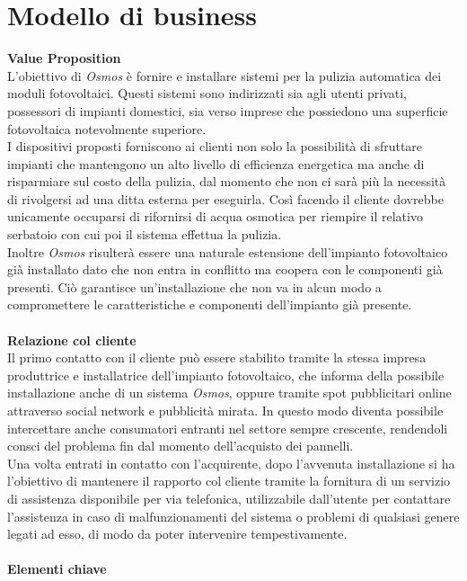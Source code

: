 \documentclass[a4paper, 12pt]{article}
\begin{document}
	\section{Modello di business}
	\textbf{Value Proposition}\\
	L'obiettivo di \emph{Osmos} è fornire e installare sistemi per la pulizia automatica dei moduli fotovoltaici. Questi sistemi sono indirizzati sia agli utenti privati, possessori di impianti domestici, sia verso imprese che possiedono una superficie fotovoltaica notevolmente superiore.\\
	I dispositivi proposti forniscono ai clienti non solo la possibilità di sfruttare impianti che mantengono un alto livello di efficienza energetica ma anche di risparmiare sul costo della pulizia, dal momento che non ci sarà più la necessità di rivolgersi ad una ditta esterna per eseguirla. Così facendo il cliente dovrebbe unicamente occuparsi di rifornirsi di acqua osmotica per riempire il relativo serbatoio con cui poi il sistema effettua la pulizia.\\
	Inoltre \emph{Osmos} risulterà essere una naturale estensione dell'impianto fotovoltaico già installato dato che non entra in conflitto ma coopera con le componenti già presenti. Ciò garantisce un'installazione che non va in alcun modo a compromettere le caratteristiche e componenti dell'impianto già presente.\\\\
	\textbf{Relazione col cliente}\\
	Il primo contatto con il cliente può essere stabilito tramite la stessa impresa produttrice e installatrice dell'impianto fotovoltaico, che informa della possibile installazione anche di un sistema \emph{Osmos}, oppure tramite spot pubblicitari online attraverso social network e pubblicità mirata. In questo modo diventa possibile intercettare anche consumatori entranti nel settore sempre crescente, rendendoli consci del problema fin dal momento dell'acquisto dei pannelli.\\
	Una volta entrati in contatto con l'acquirente, dopo l'avvenuta installazione si ha l'obiettivo di mantenere il rapporto col cliente tramite la fornitura di un servizio di assistenza disponibile per via telefonica, utilizzabile dall'utente per contattare l'assistenza in caso di malfunzionamenti del sistema o problemi di qualsiasi genere legati ad esso, di modo da poter intervenire tempestivamente.\\\\
	\textbf{Elementi chiave}\\
\end{document}
